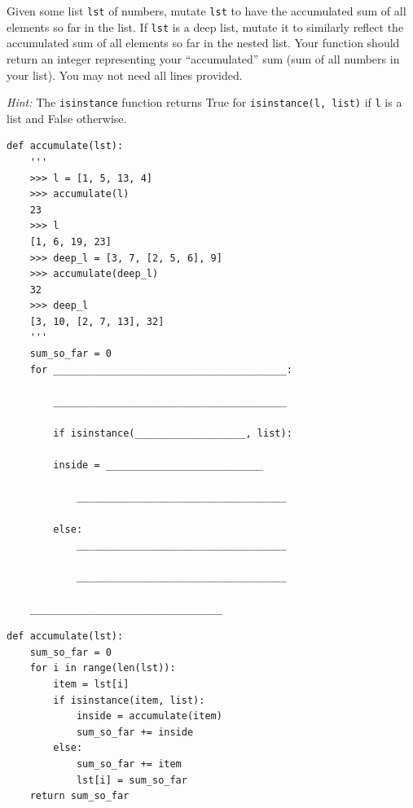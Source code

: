 \begin{blocksection}
\question Given some list \lstinline{lst} of numbers, mutate \lstinline{lst} to have the accumulated sum of all elements so far in the list. If \lstinline{lst} is a deep list, mutate it to similarly reflect the accumulated sum of all elements so far in the nested list. Your function should return an integer representing your ``accumulated'' sum (sum of all numbers in your list). You may not need all lines provided.

\emph{Hint:} The \lstinline$isinstance$ function returns True for \lstinline$isinstance(l, list)$ if \texttt{l} is a list and False otherwise.

\begin{lstlisting}
def accumulate(lst):
    '''
    >>> l = [1, 5, 13, 4]
    >>> accumulate(l)
    23
    >>> l
    [1, 6, 19, 23]
    >>> deep_l = [3, 7, [2, 5, 6], 9]
    >>> accumulate(deep_l)
    32
    >>> deep_l
    [3, 10, [2, 7, 13], 32]
    '''
    sum_so_far = 0
    for ________________________________________:

	    ________________________________________

        if isinstance(___________________, list):

	    inside = ___________________________

            ____________________________________

        else:
            ____________________________________

            ____________________________________
    
    _________________________________
\end{lstlisting}
\end{blocksection}

\begin{blocksection}
\begin{solution}[1in]
\begin{lstlisting}
def accumulate(lst):
    sum_so_far = 0
    for i in range(len(lst)):
        item = lst[i]
        if isinstance(item, list):
            inside = accumulate(item)
            sum_so_far += inside
        else:
            sum_so_far += item
            lst[i] = sum_so_far
    return sum_so_far
\end{lstlisting}
\end{solution}
\end{blocksection}


